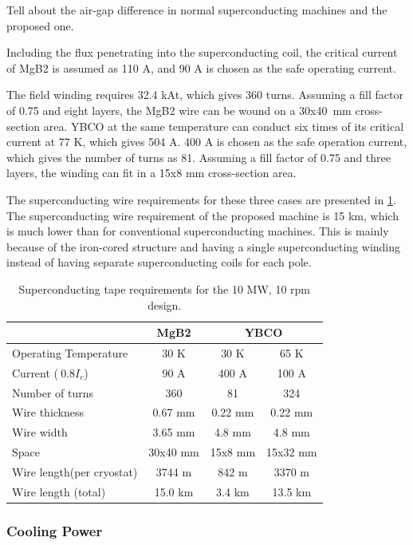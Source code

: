 \documentclass[12pt]{iopart}
\begin{document}
Tell about the air-gap difference in normal superconducting machines and the proposed one.

Including the flux penetrating into the superconducting coil, the critical current of MgB2 is assumed as 110 A, and 90 A is chosen as the safe operating current.

The field winding requires 32.4 kAt, which gives 360 turns. Assuming a fill factor of 0.75 and eight layers, the MgB2 wire can be wound on a 30x40~mm cross-section area. YBCO at the same temperature can conduct six times of its critical current at 77 K, which gives 504 A. 400 A is chosen as the safe operation current, which gives the number of turns as 81. Assuming a fill factor of 0.75 and three layers, the winding can fit in a 15x8 mm cross-section area.


The superconducting wire requirements for these three cases are presented in \ref{10MW_hts_wire_spec}. The superconducting wire requirement of the proposed machine is 15 km, which is much lower than for conventional superconducting machines. This is mainly because of the iron-cored structure and having a single superconducting winding instead of having separate superconducting coils for each pole.


\begin{table}[t]
  \centering
  \begin{tabular}{lccc}
& MgB2 & \multicolumn{2}{c}{YBCO} \\
\hline
Operating Temperature & 30 K & 30 K & 65 K \\
Current ($~0.8I_c$) & 90 A & 400 A & 100 A \\
Number of turns & 360 & 81 & 324 \\
Wire thickness & 0.67 mm & 0.22 mm & 0.22 mm \\
Wire width & 3.65 mm & 4.8 mm & 4.8 mm \\
Space & 30x40 mm & 15x8 mm & 15x32 mm \\
Wire length(per cryostat) & 3744 m & 842 m & 3370 m \\
Wire length (total) & 15.0 km & 3.4 km & 13.5 km \\
\hline
 \end{tabular}
  \caption{Superconducting tape requirements for the 10 MW, 10 rpm design.}
  \label{10MW_hts_wire_spec}
\end{table}


\subsubsection{Cooling Power}
\end{document}
